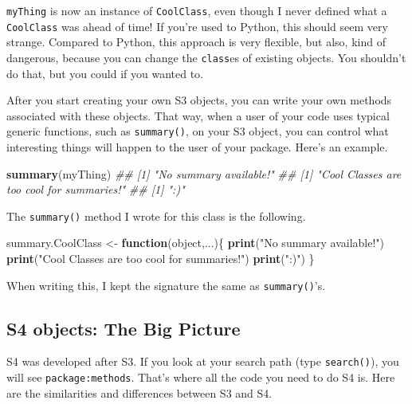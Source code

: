 \documentclass[12pt,krantz2]{krantz}
\makeatletter
\newenvironment{Shaded}{\begin{snugshade}}{\end{snugshade}}
\newcommand{\CommentTok}[1]{\textcolor[rgb]{0.37,0.37,0.37}{\textit{#1}}}
\newcommand{\ControlFlowTok}[1]{\textcolor[rgb]{0.27,0.27,0.27}{\textbf{#1}}}
\newcommand{\KeywordTok}[1]{\textcolor[rgb]{0.27,0.27,0.27}{\textbf{#1}}}
\newcommand{\NormalTok}[1]{#1}
\newcommand{\StringTok}[1]{\textcolor[rgb]{0.5,0.5,0.5}{#1}}
\newenvironment{kframe}{%
\medskip{}
\setlength{\fboxsep}{.8em}
 \def\at@end@of@kframe{}%
 \ifinner\ifhmode%
  \def\at@end@of@kframe{\end{minipage}}%
  \begin{minipage}{\columnwidth}%
 \fi\fi%
 \def\FrameCommand##1{\hskip\@totalleftmargin \hskip-\fboxsep
 \colorbox{shadecolor}{##1}\hskip-\fboxsep
     \hskip-\linewidth \hskip-\@totalleftmargin \hskip\columnwidth}%
 \MakeFramed {\advance\hsize-\width
   \@totalleftmargin\z@ \linewidth\hsize
   \@setminipage}}%
 {\par\unskip\endMakeFramed%
 \at@end@of@kframe}
\renewenvironment{Shaded}{\begin{kframe}}{\end{kframe}}
\makeatother
\begin{document}
\texttt{myThing} is now an instance of \texttt{CoolClass}, even though I never defined what a \texttt{CoolClass} was ahead of time! If you're used to Python, this should seem very strange. Compared to Python, this approach is very flexible, but also, kind of dangerous, because you can change the \texttt{class}es of existing objects. You shouldn't do that, but you could if you wanted to.

After you start creating your own S3 objects, you can write your own methods associated with these objects. That way, when a user of your code uses typical generic functions, such as \texttt{summary()}, on your S3 object, you can control what interesting things will happen to the user of your package. Here's an example.

\begin{Shaded}
\begin{Highlighting}[]
\KeywordTok{summary}\NormalTok{(myThing)}
\CommentTok{## [1] "No summary available!"}
\CommentTok{## [1] "Cool Classes are too cool for summaries!"}
\CommentTok{## [1] ":)"}
\end{Highlighting}
\end{Shaded}

The \texttt{summary()} method I wrote for this class is the following.

\begin{Shaded}
\begin{Highlighting}[]
\NormalTok{summary.CoolClass <-}\StringTok{ }\ControlFlowTok{function}\NormalTok{(object,...)\{}
  \KeywordTok{print}\NormalTok{(}\StringTok{"No summary available!"}\NormalTok{)}
  \KeywordTok{print}\NormalTok{(}\StringTok{"Cool Classes are too cool for summaries!"}\NormalTok{)}
  \KeywordTok{print}\NormalTok{(}\StringTok{":)"}\NormalTok{)}
\NormalTok{\}}
\end{Highlighting}
\end{Shaded}

When writing this, I kept the signature the same as \texttt{summary()}'s.

\hypertarget{s4-objects-the-big-picture}{%
\subsection{S4 objects: The Big Picture}\label{s4-objects-the-big-picture}}

S4 was developed after S3. If you look at your search path (type \texttt{search()}), you will see \texttt{package:methods}. That's where all the code you need to do S4 is. Here are the similarities and differences between S3 and S4.
\end{document}
